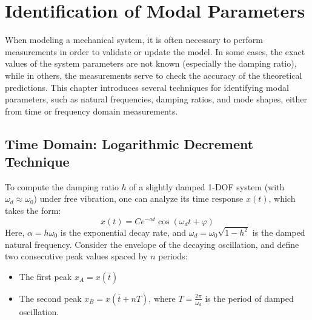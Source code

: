 
\chapter{Identification of Modal Parameters}

When modeling a mechanical system, it is often necessary to perform measurements in order to validate or update the model. In some cases, the exact values of the system parameters are not known (especially the damping ratio), while in others, the measurements serve to check the accuracy of the theoretical predictions. This chapter introduces several techniques for identifying modal parameters, such as natural frequencies, damping ratios, and mode shapes, either from time or frequency domain measurements.

\section{Time Domain: Logarithmic Decrement Technique}

To compute the damping ratio \( h \) of a slightly damped 1-DOF system (with \( \omega_d \approx \omega_0 \)) under free vibration, one can analyze its time response \( x(t) \), which takes the form:
\[
x(t) = C e^{-\alpha t} \cos(\omega_d t + \varphi)
\]
Here, \( \alpha = h \omega_0 \) is the exponential decay rate, and \( \omega_d = \omega_0 \sqrt{1 - h^2} \) is the damped natural frequency. Consider the envelope of the decaying oscillation, and define two consecutive peak values spaced by \( n \) periods:
\begin{itemize}
    \item The first peak \( x_A = x(\bar{t}) \)
    \item The second peak \( x_B = x(\bar{t} + nT) \), where \( T = \frac{2\pi}{\omega_d} \) is the period of damped oscillation.
\end{itemize} 

